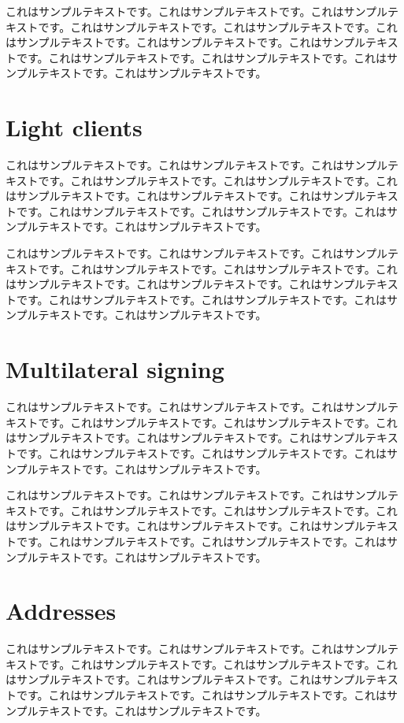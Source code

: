 \documentclass[a4paper, dvipdfmx]{jsarticle}
\begin{document}
これはサンプルテキストです。これはサンプルテキストです。これはサンプルテキストです。これはサンプルテキストです。これはサンプルテキストです。これはサンプルテキストです。これはサンプルテキストです。これはサンプルテキストです。これはサンプルテキストです。これはサンプルテキストです。これはサンプルテキストです。これはサンプルテキストです。

\section{Light clients}
これはサンプルテキストです。これはサンプルテキストです。これはサンプルテキストです。これはサンプルテキストです。これはサンプルテキストです。これはサンプルテキストです。これはサンプルテキストです。これはサンプルテキストです。これはサンプルテキストです。これはサンプルテキストです。これはサンプルテキストです。これはサンプルテキストです。

これはサンプルテキストです。これはサンプルテキストです。これはサンプルテキストです。これはサンプルテキストです。これはサンプルテキストです。これはサンプルテキストです。これはサンプルテキストです。これはサンプルテキストです。これはサンプルテキストです。これはサンプルテキストです。これはサンプルテキストです。これはサンプルテキストです。

\section{Multilateral signing}
これはサンプルテキストです。これはサンプルテキストです。これはサンプルテキストです。これはサンプルテキストです。これはサンプルテキストです。これはサンプルテキストです。これはサンプルテキストです。これはサンプルテキストです。これはサンプルテキストです。これはサンプルテキストです。これはサンプルテキストです。これはサンプルテキストです。

これはサンプルテキストです。これはサンプルテキストです。これはサンプルテキストです。これはサンプルテキストです。これはサンプルテキストです。これはサンプルテキストです。これはサンプルテキストです。これはサンプルテキストです。これはサンプルテキストです。これはサンプルテキストです。これはサンプルテキストです。これはサンプルテキストです。

\section{Addresses}
これはサンプルテキストです。これはサンプルテキストです。これはサンプルテキストです。これはサンプルテキストです。これはサンプルテキストです。これはサンプルテキストです。これはサンプルテキストです。これはサンプルテキストです。これはサンプルテキストです。これはサンプルテキストです。これはサンプルテキストです。これはサンプルテキストです。
\end{document}
